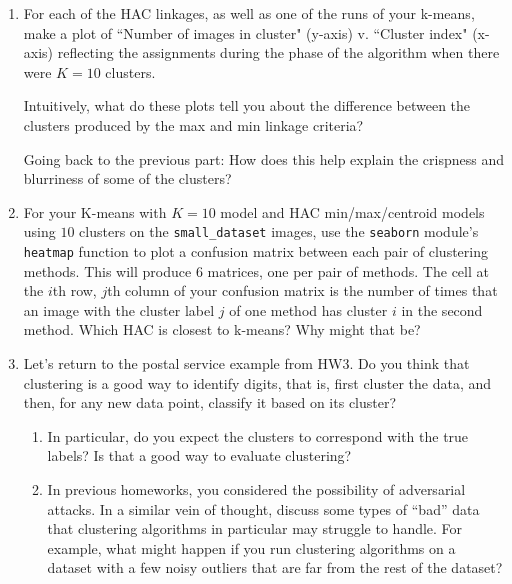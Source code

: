 \documentclass[submit]{../harvardml}
\begin{document}
\begin{problem}
\begin{enumerate}
    \item For each of the HAC linkages, as well as one of the runs of your k-means, make a plot of ``Number of images in cluster" (y-axis)
      v. ``Cluster index" (x-axis) reflecting the assignments during the phase of the algorithm when there were $K=10$ clusters.

      Intuitively, what do these plots tell you about the difference
      between the clusters produced by the max and min linkage criteria?

      Going back to the previous part: How does this help explain the
      crispness and blurriness of some of the clusters?  
      
    \item For your K-means with $K = 10$ model and HAC min/max/centroid models using $10$ clusters on the \texttt{small\_dataset} images, use the \texttt{seaborn} module's \texttt{heatmap} function to plot a confusion matrix between each pair of clustering methods.  This will produce 6 matrices, one per pair of methods. The cell at the $i$th row, $j$th column of your confusion matrix is the number of times that an image with the cluster label $j$ of one method has cluster $i$ in the second method.  Which HAC is closest to k-means? Why might that be?

    \item Let's return to the postal service example from HW3.  Do you think that clustering is a good way to identify digits, that is, first cluster the data, and then, for any new data point, classify it based on its cluster?
      \begin{enumerate}
        \item In particular, do you expect the clusters to correspond with the true labels?  Is that a good way to evaluate clustering?
        
        \item In previous homeworks, you considered the possibility of adversarial attacks. In a similar vein of thought, discuss some types of ``bad'' data that clustering algorithms in particular may struggle to handle. For example, what might happen if you run clustering algorithms on a dataset with a few noisy outliers that are far from the rest of the dataset?
      \end{enumerate}
  \end{enumerate}
\end{problem}
\end{document}
